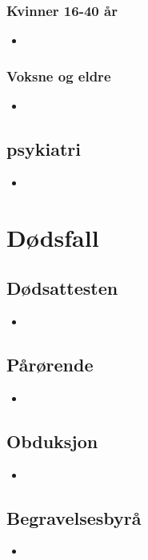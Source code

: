 \documentclass[12pt,a4paper]{memoir}
\begin{document}
		\subsection{Kvinner 16-40 år}
			\begin{itemize}
				\item
			\end{itemize}
		\subsection{Voksne og eldre}
			\begin{itemize}
				\item
			\end{itemize}
	\section{psykiatri}
		\begin{itemize}
			\item
		\end{itemize}

\newpage
\chapter{Dødsfall}
	\section{Dødsattesten}
		\begin{itemize}
			\item
		\end{itemize}
	\section{Pårørende}
		\begin{itemize}
			\item
		\end{itemize}
	\section{Obduksjon}
		\begin{itemize}
			\item
		\end{itemize}
	\section{Begravelsesbyrå}
		\begin{itemize}
			\item
		\end{itemize}
\end{document}
